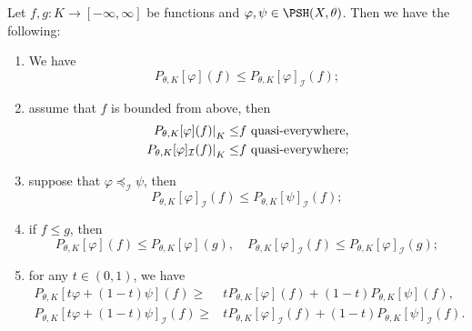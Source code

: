 \begin{proposition}\label{prop:partial_env}
    Let $f,g\colon K\rightarrow [-\infty,\infty]$ be functions and $\varphi,\psi\in \PSH(X,\theta)$. Then we have the following:
    \begin{enumerate}
        \item\label{itm:prop:partial_env:1} We have
        \[
        P_{\theta,K}[\varphi](f)\leq P_{\theta,K}[\varphi]_{\mathcal{I}}(f);
        \]
        \item\label{itm:prop:partial_env:2} assume that $f$ is bounded from above, then
        \[
        \begin{aligned}
            \left.P_{\theta,K}[\varphi](f)\right|_K\leq & f\textup{ quasi-everywhere},\\
             \left. P_{\theta,K}[\varphi]_{\mathcal{I}}(f)\right|_K\leq & f\textup{ quasi-everywhere};
        \end{aligned}
        \]
        \item\label{itm:prop:partial_env:3} suppose that $\varphi\preceq_{\mathcal{I}}\psi$, then
        \[
            P_{\theta,K}[\varphi]_{\mathcal{I}}(f)\leq P_{\theta,K}[\psi]_{\mathcal{I}}(f);
        \]
        \item\label{itm:prop:partial_env:4} if $f\leq g$, then
        \[
        P_{\theta,K}[\varphi](f)\leq P_{\theta,K}[\varphi](g),\quad P_{\theta,K}[\varphi]_{\mathcal{I}}(f)\leq P_{\theta,K}[\varphi]_{\mathcal{I}}(g);
        \]
        \item\label{itm:prop:partial_env:5} for any $t \in (0,1)$, we have
        \[
        \begin{aligned}
            P_{\theta,K}\left[t\varphi+(1-t)\psi\right](f)\geq & tP_{\theta,K}[\varphi](f)+(1-t)P_{\theta,K}[\psi](f),\\
            P_{\theta,K}\left[t\varphi+(1-t)\psi\right]_{\mathcal{I}}(f)\geq & tP_{\theta,K}[\varphi]_{\mathcal{I}}(f)+(1-t)P_{\theta,K}[\psi]_{\mathcal{I}}(f).
        \end{aligned}
        \]
    \end{enumerate}
\end{proposition}
